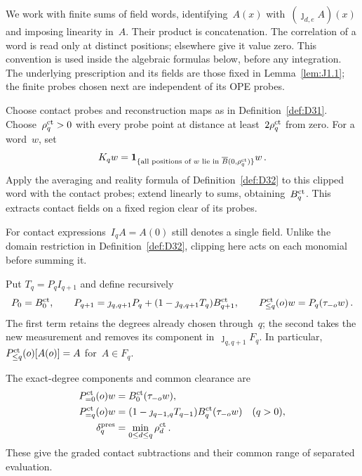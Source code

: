 We work with finite sums of field words, identifying~$A(x)$ with~$(\jmath_{d,e}A)(x)$ and imposing linearity in~$A$. Their product is concatenation. The correlation of a word is read only at distinct positions; elsewhere give it value zero. This convention is used inside the algebraic formulas below, before any integration. The underlying prescription and its fields are those fixed in Lemma~\ref{lem:J1.1}; the finite probes chosen next are independent of its OPE probes.

\begin{definition}\label{def:D36}
Choose contact probes and reconstruction maps as in Definition~\ref{def:D31}. Choose~$\rho_q^{\rm ct}>0$ with every probe point at distance at least~$2\rho_q^{\rm ct}$ from zero. For a word~$w$, set
\begin{equation*}
K_qw=\mathbf1_{\{\text{all positions of }w\text{ lie in }\overline B(0,\rho_q^{\rm ct})\}}w\,.
\end{equation*}
Apply the averaging and reality formula of Definition~\ref{def:D32} to this clipped word with the contact probes; extend linearly to sums, obtaining~$B_q^{\rm ct}$. This extracts contact fields on a fixed region clear of its probes.
\end{definition}

For contact expressions~$I_qA=A(0)$ still denotes a single field. Unlike the domain restriction in Definition~\ref{def:D32}, clipping here acts on each monomial before summing it.

\begin{samepage}
\begin{definition}\label{def:D37}
Put $T_q=P_qI_{q+1}$ and define recursively
\begin{equation*}
P_0=B_0^{\rm ct},\qquad
P_{q+1}=\jmath_{q,q+1}P_q+(1-\jmath_{q,q+1}T_q)B_{q+1}^{\rm ct},\qquad
P_{\le q}^{\rm ct}(o)w=P_q(\tau_{-o}w)\,.
\end{equation*}
The first term retains the degrees already chosen through~$q$; the second takes the new measurement and removes its component in~$\jmath_{q,q+1}F_q$. In particular, $P_{\le q}^{\rm ct}(o)[A(o)]=A$ for~$A\in F_q$.
\end{definition}
\end{samepage}

\begin{definition}\label{def:D38}
The exact-degree components and common clearance are
\begin{align*}
P_{=0}^{\rm ct}(o)w&=B_0^{\rm ct}(\tau_{-o}w),\\
P_{=q}^{\rm ct}(o)w&=(1-\jmath_{q-1,q}T_{q-1})B_q^{\rm ct}(\tau_{-o}w)\quad(q>0),\\
\delta_q^{\rm pres}&=\min_{0\le d\le q}\rho_d^{\rm ct}\,.
\end{align*}
These give the graded contact subtractions and their common range of separated evaluation.
\end{definition}

